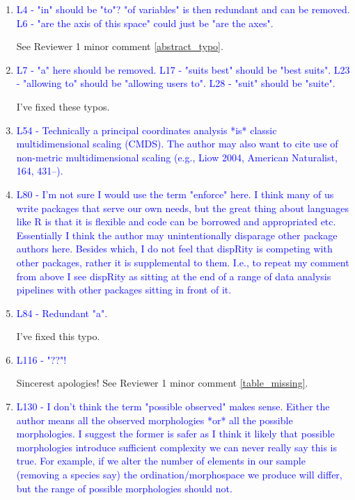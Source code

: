 \documentclass[12pt,letterpaper]{article}
\begin{document}
\begin{enumerate}

\item{\textcolor{blue}{L4 - "in" should be "to"? "of variables" is then redundant and can be removed. L6 - "are the axis of this space" could just be "are the axes".}}

See Reviewer 1 minor comment \ref{abstract_typo}.

\item{\textcolor{blue}{L7 - "a" here should be removed. L17 - "suits best" should be "best suits". L23 - "allowing to" should be "allowing users to". L28 - "suit" should be "suite".}}

I've fixed these typos.

\item{\textcolor{blue}{L54 - Technically a principal coordinates analysis *is* classic multidimensional scaling (CMDS). The author may also want to cite use of non-metric multidimensional scaling (e.g., Liow 2004, American Naturalist, 164, 431–).}}


\item{\textcolor{blue}{L80 - I'm not sure I would use the term "enforce" here. I think many of us write packages that serve our own needs, but the great thing about languages like R is that it is flexible and code can be borrowed and appropriated etc. Essentially I think the author may unintentionally disparage other package authors here. Besides which, I do not feel that dispRity is competing with other packages, rather it is supplemental to them. I.e., to repeat my comment from above I see dispRity as sitting at the end of a range of data analysis pipelines with other packages sitting in front of it.}}


\item{\textcolor{blue}{L84 - Redundant "a".}}

I've fixed this typo.

\item{\textcolor{blue}{L116 - "??"!}}

Sincerest apologies! See Reviewer 1 minor comment \ref{table_missing}.

\item{\textcolor{blue}{L130 - I don't think the term "possible observed" makes sense. Either the author means all the observed morphologies *or* all the possible morphologies. I suggest the former is safer as I think it likely that possible morphologies introduce sufficient complexity we can never really say this is true. For example, if we alter the number of elements in our sample (removing a species say) the ordination/morphospace we produce will differ, but the range of possible morphologies should not.}}


\end{enumerate}
\end{document}
